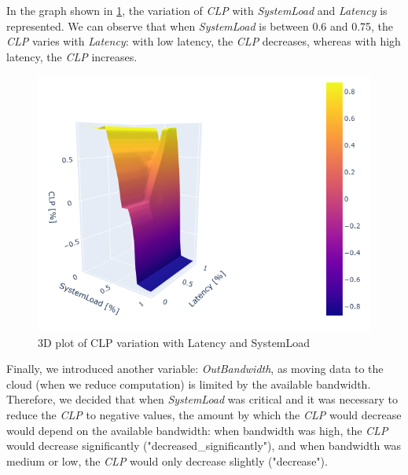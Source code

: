 \documentclass[titlepage]{article}
\begin{document}
In the graph shown in \cref{fig:3d_latency_triangular_v4}, the variation of \textit{CLP} with \textit{SystemLoad} and \textit{Latency} is represented.
We can observe that when \textit{SystemLoad} is between 0.6 and 0.75, the \textit{CLP} varies with \textit{Latency}: with low latency, the \textit{CLP} decreases, whereas with high latency, the \textit{CLP} increases.

\begin{figure}[H]
    \centering
\includegraphics[scale = 0.6]{../images/3d_triangular_v4_latency}
\caption{3D plot of CLP variation with Latency and SystemLoad}
\label{fig:3d_latency_triangular_v4}
\end{figure}



Finally, we introduced another variable: \textit{OutBandwidth}, as moving data to the cloud (when we reduce computation) is limited by the available bandwidth.
Therefore, we decided that when \textit{SystemLoad} was critical and it was necessary to reduce the \textit{CLP} to negative values, the amount by which the \textit{CLP} would decrease would depend on the available bandwidth: when bandwidth was high, the \textit{CLP} would decrease significantly ("decreased\_significantly"), and when bandwidth was medium or low, the \textit{CLP} would only decrease slightly ("decrease").


\end{document}
